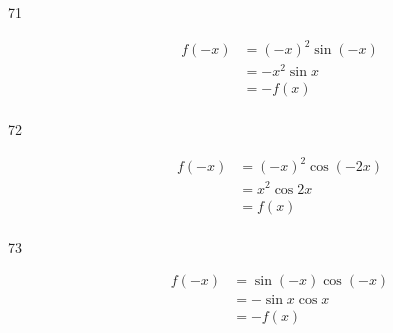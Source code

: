 \documentclass{exam}
\begin{document}
\begin{description}




      \item[71]
        \begin{align*}
          f(-x) & = (-x)^2 \sin(-x) \\
                & = - x^2 \sin x \\
                & = - f(x) \\
        \end{align*}


      \item[72]
        \begin{align*}
          f(-x) & = (-x)^2 \cos(-2x) \\
                & = x^2 \cos 2x \\
                & = f(x) \\
        \end{align*}


      \item[73]
        \begin{align*}
          f(-x) & = \sin (-x) \cos (-x) \\
                & = - \sin x \cos x \\
                & = -f(x) \\
        \end{align*}


\end{description}
\end{document}
